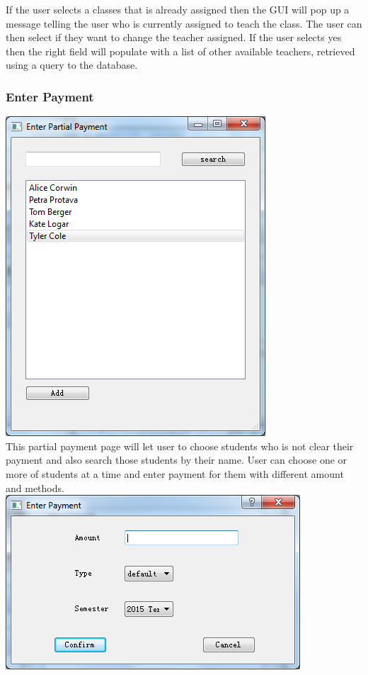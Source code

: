 If the user selects a classes that is already assigned then the GUI will pop up a message telling the user who is currently assigned to teach the class. The user can then select if they want to change the teacher assigned. If the user selects yes then the right field will populate with a list of other available teachers, retrieved using a query to the database.

\subsubsection{Enter Payment}
\includegraphics[scale=0.5]{pics/partial_pay_main.png}\\
This partial payment page will let user to choose students who is not clear their payment and also search those students by their name. User can choose one or more of students at a time and enter payment for them with different amount and methods.\\
\includegraphics[scale=0.5]{pics/partial_pay_sub.png}\\
